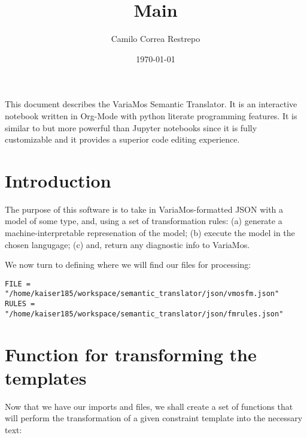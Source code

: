 \documentclass[11pt]{article}
\author{Camilo Correa Restrepo}
\date{\today}
\title{Main}
\begin{document}
\maketitle
\tableofcontents

This document describes the VariaMos Semantic Translator.
It is an interactive notebook written in Org-Mode with python literate programming features.
It is similar to but more powerful than Jupyter notebooks since it is fully customizable and it provides a superior code editing experience.

\section{Introduction}
\label{sec:orgbc57191}
The purpose of this software is to take in VariaMos-formatted JSON with a model
of some type, and, using a set of transformation rules:
(a) generate a machine-interpretable represenation of the model;
(b) execute the model in the chosen langugage;
(c) and, return any diagnostic info to VariaMos.

We now turn to defining where we will find our files for processing:

\begin{verbatim}
FILE = "/home/kaiser185/workspace/semantic_translator/json/vmosfm.json"
RULES = "/home/kaiser185/workspace/semantic_translator/json/fmrules.json"
\end{verbatim}

\section{Function for transforming the templates}
\label{sec:orgc877009}
Now that we have our imports and files, we shall create a set of functions that will perform the transformation of a given constraint template into the necessary text:
\end{document}
